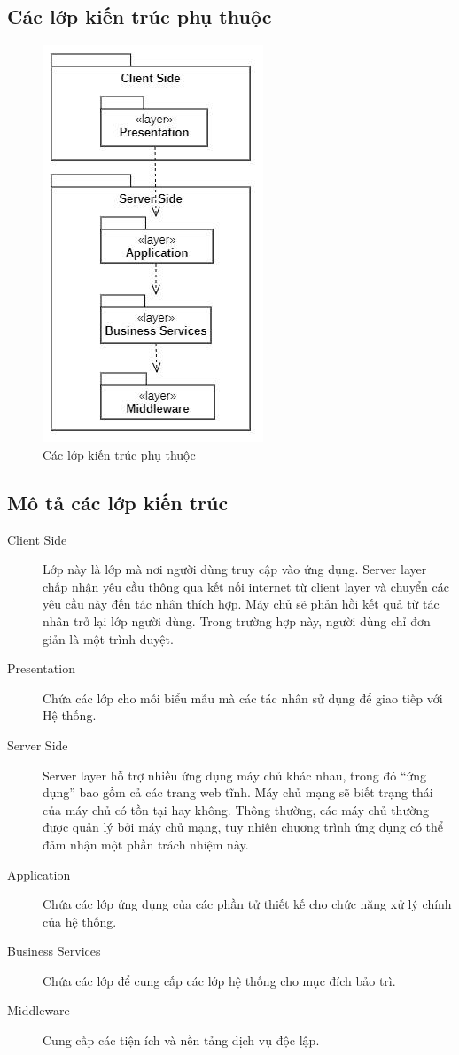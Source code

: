 \documentclass[./../main.tex]{subfiles}
\begin{document}
\subsection{Các lớp kiến trúc phụ thuộc}
\begin{figure}[H]
	\centering
	\includegraphics{./images/layer_and_dependencies.png}
	\caption{Các lớp kiến trúc phụ thuộc}
\end{figure}
\subsection{Mô tả các lớp kiến trúc}
\begin{description}
	\item[Client Side] Lớp này là lớp mà nơi người dùng truy cập vào ứng dụng. Server layer chấp nhận yêu cầu thông qua kết nối internet từ client layer và chuyển các yêu cầu này đến tác nhân thích hợp. Máy chủ sẽ phản hồi kết quả từ tác nhân trở lại lớp người dùng. Trong trường hợp này, người dùng chỉ đơn giản là một trình duyệt.
	\item[Presentation] Chứa các lớp cho mỗi biểu mẫu mà các tác nhân sử dụng để giao tiếp với Hệ thống.
	\item[Server Side] Server layer hỗ trợ nhiều ứng dụng máy chủ khác nhau, trong đó “ứng dụng” bao gồm cả các trang web tĩnh. Máy chủ mạng sẽ biết trạng thái của máy chủ có tồn tại hay không. Thông thường, các máy chủ thường được quản lý bởi máy chủ mạng, tuy nhiên chương trình ứng dụng có thể đảm nhận một phần trách nhiệm này.
	\item[Application] Chứa các lớp ứng dụng của các phần tử thiết kế cho chức năng xử lý chính của hệ thống.
	\item[Business Services] Chứa các lớp để cung cấp các lớp hệ thống cho mục đích bảo trì.
	\item[Middleware] Cung cấp các tiện ích và nền tảng dịch vụ độc lập.

\end{description}
\end{document}
